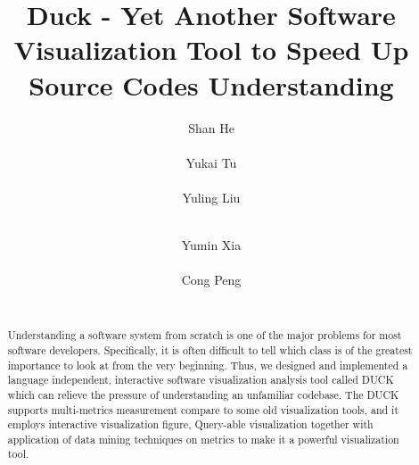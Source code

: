 \documentclass{sig-alternate}
\begin{document}
\makeatletter
\def\@copyrightspace{\relax}
\makeatother

\title{
Duck - Yet Another Software Visualization Tool to Speed Up Source Codes Understanding
}

%
\author{
%
%
\alignauthor
Shan He\\
       \\
\alignauthor
Yukai Tu\\
       \\
\alignauthor
Yuling Liu\\
       \\
\and
\alignauthor
Yumin Xia\\
       \\
\alignauthor
Cong Peng\\
       \\
}

\maketitle
\begin{abstract}
Understanding a software system from scratch is one of the major problems for most software developers. Specifically, it is often difficult to tell which class is of the greatest importance to look at from the very beginning. Thus, we designed and implemented a language independent, interactive software visualization analysis tool called DUCK which can relieve the pressure of understanding an unfamiliar codebase. The DUCK supports multi-metrics measurement compare to some old visualization tools, and it employs interactive visualization figure, Query-able visualization together with application of data mining techniques on metrics to make it a powerful visualization tool. 

\end{abstract}
\end{document}
